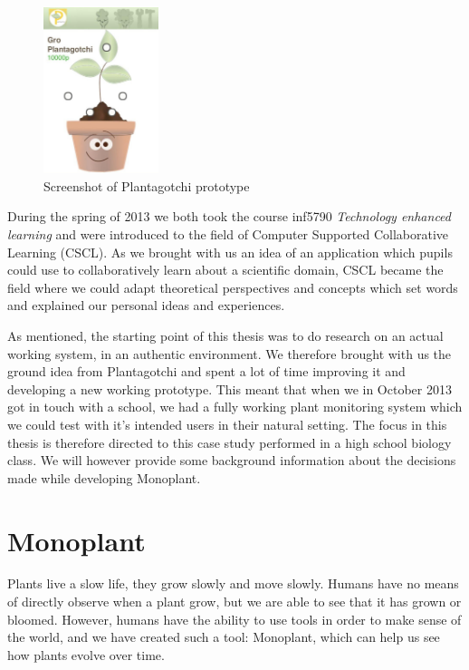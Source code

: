 \begin{figure}
\centering
\includegraphics[width=0.3\textwidth]{img/introduction/plantagotchi.jpg}
\caption{Screenshot of Plantagotchi prototype}
\label{fig:scrshotplantagotchi}
\end{figure}

During the spring of 2013 we both took the course inf5790 \emph{Technology enhanced learning} and were introduced to the field of Computer Supported Collaborative Learning (CSCL). As we brought with us an idea of an application which pupils could use to collaboratively learn about a scientific domain, CSCL became the field where we could adapt theoretical perspectives and concepts which set words and explained our personal ideas and experiences. 

As mentioned, the starting point of this thesis was to do research on an actual working system, in an authentic environment. We therefore brought with us the ground idea from Plantagotchi and spent a lot of time improving it and developing a new working prototype. This meant that when we in October 2013 got in touch with a school, we had a fully working plant monitoring system which we could test with it's intended users in their natural setting. The focus in this thesis is therefore directed to this case study performed in a high school biology class. We will however provide some background information about the decisions made while developing Monoplant. 

\section{Monoplant}
Plants live a slow life, they grow slowly and move slowly. Humans have no means of directly observe when a plant grow, but we are able to see that it has grown or bloomed. However, humans have the ability to use tools in order to make sense of the world, and we have created such a tool: Monoplant, which can help us see how plants evolve over time.

